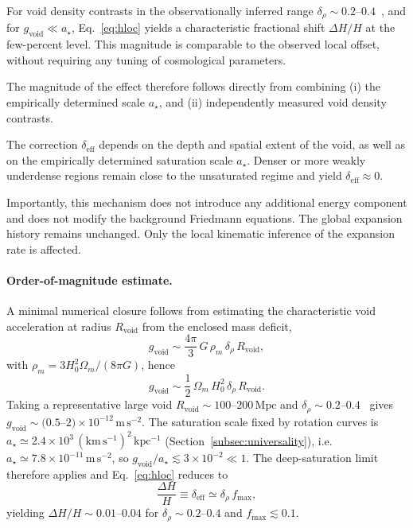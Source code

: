   For void density contrasts in the observationally inferred range
  $\delta_\rho \sim 0.2$--$0.4$~\cite{Keenan2013KBC},
  and for $g_{\mathrm{void}} \ll a_\star$,
  Eq.~\eqref{eq:hloc} yields a characteristic fractional shift
  $\Delta H/H$ at the few-percent level.
  This magnitude is comparable to the observed local offset,
  without requiring any tuning of cosmological parameters.

  The magnitude of the effect therefore follows directly from combining
  (i) the empirically determined scale $a_\star$,
  and
  (ii) independently measured void density contrasts.

  The correction $\delta_{\mathrm{eff}}$ depends on the depth and spatial extent
  of the void, as well as on the empirically determined saturation scale
  $a_\star$.
  Denser or more weakly underdense regions remain close to the unsaturated regime
  and yield $\delta_{\mathrm{eff}} \approx 0$.

  Importantly, this mechanism does not introduce any additional energy component
  and does not modify the background Friedmann equations.
  The global expansion history remains unchanged.
  Only the local kinematic inference of the expansion rate is affected.

  \paragraph*{Order-of-magnitude estimate.}
    A minimal numerical closure follows from estimating the characteristic void acceleration
    at radius $R_{\mathrm{void}}$ from the enclosed mass deficit,
    \begin{equation}
      g_{\mathrm{void}}
      \sim \frac{4\pi}{3}\,G\,\rho_m\,\delta_\rho\,R_{\mathrm{void}},
      \label{eq:gvoid_estimate}
    \end{equation}
    with $\rho_m = 3H_0^2\Omega_m/(8\pi G)$, hence
    \begin{equation}
      g_{\mathrm{void}}
      \sim \frac{1}{2}\,\Omega_m\,H_0^2\,\delta_\rho\,R_{\mathrm{void}}.
      \label{eq:gvoid_estimate_simplified}
    \end{equation}
    Taking a representative large void $R_{\mathrm{void}} \sim 100$--$200\,\mathrm{Mpc}$
    and $\delta_\rho \sim 0.2$--$0.4$~\cite{Keenan2013KBC} gives
    $g_{\mathrm{void}} \sim (0.5$--$2)\times 10^{-12}\,\mathrm{m\,s^{-2}}$.
    The saturation scale fixed by rotation curves is
    $a_\star \simeq 2.4\times 10^{3}\,(\mathrm{km\,s^{-1}})^2\,\mathrm{kpc^{-1}}$
    (Section~\ref{subsec:universality}), i.e.
    $a_\star \simeq 7.8\times 10^{-11}\,\mathrm{m\,s^{-2}}$,
    so $g_{\mathrm{void}}/a_\star \lesssim 3\times 10^{-2} \ll 1$.
    The deep-saturation limit therefore applies and
    Eq.~\eqref{eq:hloc} reduces to
    \begin{equation}
      \frac{\Delta H}{H}
      \equiv
      \delta_{\mathrm{eff}}
      \simeq
      \delta_\rho\,f_{\max},
      \label{eq:dH_over_H_saturated}
    \end{equation}
    yielding $\Delta H/H \sim 0.01$--$0.04$ for $\delta_\rho \sim 0.2$--$0.4$
    and $f_{\max} \lesssim 0.1$.

